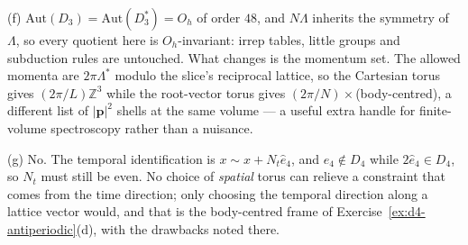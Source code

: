 {(f) $\mathrm{Aut}(D_3)=\mathrm{Aut}(D_3^{*})=O_h$ of order $48$, and $N\Lambda$
inherits the symmetry of $\Lambda$, so every quotient here is $O_h$-invariant:
irrep tables, little groups and subduction rules are untouched. What changes is
the momentum set. The allowed momenta are $2\pi\Lambda^{*}$ modulo the slice's
reciprocal lattice, so the Cartesian torus gives $(2\pi/L)\mathbb{Z}^3$ while
the root-vector torus gives $(2\pi/N)\times$(body-centred), a different list of
$|\mathbf{p}|^2$ shells at the same volume --- a useful extra handle for
finite-volume spectroscopy rather than a nuisance.

(g) No. The temporal identification is $x\sim x+N_t\hat{e}_4$, and
$\hat{e}_4\notin D_4$ while $2\hat{e}_4\in D_4$, so $N_t$ must still be even.
No choice of \emph{spatial} torus can relieve a constraint that comes from the
time direction; only choosing the temporal direction along a lattice vector
would, and that is the body-centred frame of
Exercise~\ref{ex:d4-antiperiodic}(d), with the drawbacks noted there.}

